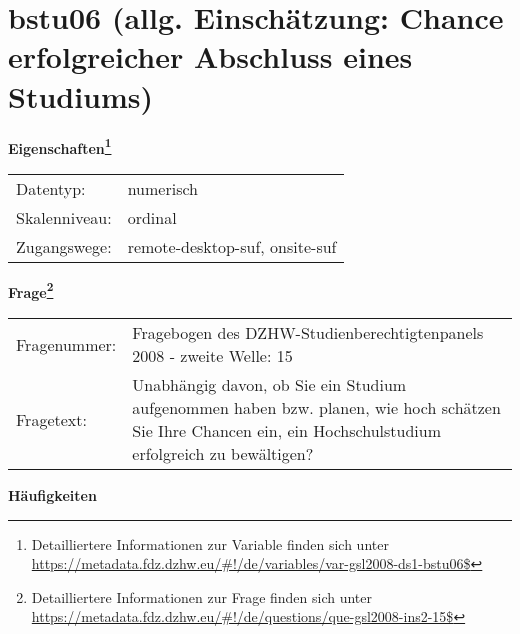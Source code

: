 
    \setcounter{footnote}{0}

    \vspace*{-1.8cm}
	\section{bstu06 (allg. Einschätzung: Chance erfolgreicher Abschluss eines Studiums)}
	\label{section:bstu06}



    \vspace*{0.5cm}
    \noindent\textbf{Eigenschaften\footnote{Detailliertere Informationen zur Variable finden sich unter
		\url{https://metadata.fdz.dzhw.eu/\#!/de/variables/var-gsl2008-ds1-bstu06$}}}\\
	\begin{tabularx}{\hsize}{@{}lX}
	Datentyp: & numerisch \\
	Skalenniveau: & ordinal \\
	Zugangswege: &
	  remote-desktop-suf, 
	  onsite-suf
 \\
    \end{tabularx}



				\vspace*{0.5cm}
                \noindent\textbf{Frage\footnote{Detailliertere Informationen zur Frage finden sich unter
		              \url{https://metadata.fdz.dzhw.eu/\#!/de/questions/que-gsl2008-ins2-15$}}}\\
				\begin{tabularx}{\hsize}{@{}lX}
					Fragenummer: &
					  Fragebogen des DZHW-Studienberechtigtenpanels 2008 - zweite Welle:
					  15
 \\
					Fragetext: & Unabhängig davon, ob Sie ein Studium aufgenommen haben bzw. planen, wie hoch schätzen Sie Ihre Chancen ein, ein Hochschulstudium erfolgreich zu bewältigen? \\
				\end{tabularx}





        		\vspace*{0.5cm}
                \noindent\textbf{Häufigkeiten}

